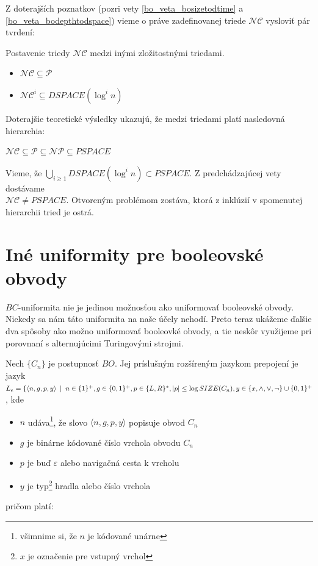 {Z doterajších poznatkov (pozri vety \ref{bo_veta_bosizetodtime} a \ref{bo_veta_bodepthtodspace})
vieme o práve zadefinovanej triede $\mathcal{NC}$ vysloviť pár tvrdení:

\begin{veta}
  Postavenie triedy $\mathcal{NC}$ medzi inými zložitostnými triedami.
  \begin{itemize}
    \item $\mathcal{NC}\subseteq\mathcal{P}$
    \item $\mathcal{NC}^i\subseteq DSPACE(\log^i n)$
  \end{itemize}
\end{veta}

Doterajšie teoretické výsledky ukazujú, že medzi triedami platí nasledovná hierarchia:

\centerline{$\mathcal{NC}\subseteq\mathcal{P}\subseteq\mathcal{NP}\subseteq PSPACE$}

Vieme, že $\bigcup\limits_{i\geq 1} DSPACE(\log^i n)\subset PSPACE$. Z predchádzajúcej vety
dostávame\\ $\mathcal{NC}\neq PSPACE$. Otvoreným problémom zostáva, ktorá z inklúzií v spomenutej
hierarchii tried je ostrá.

\section{Iné uniformity pre booleovské obvody}

$BC$-uniformita nie je jedinou možnosťou ako uniformovať
booleovské obvody. Niekedy sa nám táto uniformita na naše účely
nehodí. Preto teraz ukážeme ďalšie dva spôsoby ako možno
uniformovať booleovké obvody, a tie neskôr využijeme pri porovnaní
s alternujúcimi Turingovými strojmi.

\begin{definicia}
  Nech $\{ C_n\}$ je postupnosť $BO$. Jej príslušným rozšíreným
  jazykom prepojení je jazyk $L_e=\{
  \\ \langle n,g,p,y\rangle\enspace |\enspace
  n\in\{ 1\}^+, g\in\{ 0,1\}^+, p\in\{ L,R\}^*, |p|\leq\log
  SIZE(C_n), y\in \{ x, \wedge, \vee, \neg\}\cup\{ 0,1\}^+$, kde
  \begin{itemize}
    \item $n$ udáva\footnote{všimnime si, že $n$ je kódované unárne},
    že slovo $\langle n,g,p,y\rangle$ popisuje obvod $C_n$
    \item $g$ je binárne kódované číslo vrchola obvodu $C_n$
    \item $p$ je buď $\varepsilon$ alebo navigačná cesta k vrcholu
    \item $y$ je typ\footnote{$x$ je označenie pre vstupný vrchol}
    hradla alebo číslo vrchola
  \end{itemize}
  pričom platí:


\end{definicia}}
